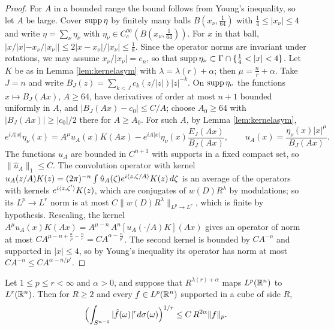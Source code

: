 \begin{proof}
For $A$ in a bounded range the bound follows from Young's inequality, so let $A$ be large. Cover
$\operatorname{supp}\eta$ by finitely many balls $B(x_\nu,\frac1{64})$ with $\frac14\le|x_\nu|\le4$ and write
$\eta=\sum_\nu\eta_\nu$ with $\eta_\nu\in C^\infty_c(B(x_\nu,\frac1{64}))$. For $x$ in that ball,
$|x/|x|-x_\nu/|x_\nu||\le2|x-x_\nu|/|x_\nu|\le\frac18$. Since the operator norms are invariant under
rotations, we may assume $x_\nu/|x_\nu|=e_n$, so that $\supp\eta_\nu\subset\Gamma\cap\{\frac14<|x|<4\}$. Let $K$ be as
in Lemma \ref{lem:kernelasym} with $\lambda=\lambda(r)+\alpha$; then $\mu=\frac nr+\alpha$. Take $J=n$ and write
$B_J(z)=\sum_{k<J}c_k(z/|z|)|z|^{-k}$. On $\operatorname{supp}\eta_\nu$ the functions $x\mapsto B_J(Ax)$, $A\ge64$, have
derivatives of order at most $n+1$ bounded uniformly in $A$, and $|B_J(Ax)-c_0|\le C/A$; choose $A_0\ge64$
with $|B_J(Ax)|\ge|c_0|/2$ there for $A\ge A_0$. For such $A$, by Lemma \ref{lem:kernelasym},
\[
e^{iA|x|}\eta_\nu(x)=A^\mu u_A(x)K(Ax)-e^{iA|x|}\eta_\nu(x)\frac{E_J(Ax)}{B_J(Ax)},\qquad
u_A(x)=\frac{\eta_\nu(x)|x|^\mu}{B_J(Ax)} .
\]
The functions $u_A$ are bounded in $C^{n+1}$ with supports in a fixed compact set, so
$\|\hat u_A\|_1\le C$. The convolution operator with kernel $u_A(z/A)K(z)
=(2\pi)^{-n}\int\hat u_A(\zeta)e^{i\langle z,\zeta/A\rangle}K(z)\,d\zeta$ is an average of the operators with kernels
$e^{i\langle z,\zeta'\rangle}K(z)$, which are conjugates of $w(D)R^\lambda$ by modulations; so its $L^p\to L^r$ norm is
at most $C\|w(D)R^\lambda\|_{L^p\to L^r}$, which is finite by hypothesis. Rescaling, the kernel
$A^\mu u_A(x)K(Ax)=A^{\mu-n}\,A^n[u_A(\cdot/A)K](Ax)$ gives an operator of norm at most
$CA^{\mu-n+\frac np-\frac nr}=CA^{\alpha-\frac n{p'}}$. The second kernel is bounded by $CA^{-n}$ and supported in
$|x|\le4$, so by Young's inequality its operator has norm at most $CA^{-n}\le CA^{\alpha-n/p'}$.
\end{proof}

\begin{proposition}\label{prop:restr}
Let $1\le p\le r<\infty$ and $\alpha>0$, and suppose that $R^{\lambda(r)+\alpha}$ maps $L^p(\mathbb{R}^n)$ to $L^r(\mathbb{R}^n)$.
Then for $R\ge2$ and every $f\in L^p(\mathbb{R}^n)$ supported in a cube of side $R$,
\[
\Bigl(\int_{S^{n-1}}|\hat f(\omega)|^rd\sigma(\omega)\Bigr)^{1/r}\le C\,R^{2\alpha}\|f\|_p .
\]
\end{proposition}


